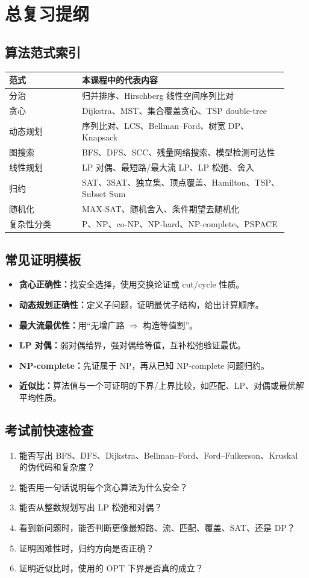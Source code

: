 \documentclass[UTF8,openany,12pt]{ctexbook}
\theoremstyle{remark}
\newcommand{\OPT}{\mathrm{OPT}}
\begin{document}
\backmatter
\chapter{总复习提纲}

\section{算法范式索引}
\begin{longtable}{p{0.24\linewidth}p{0.68\linewidth}}
\toprule
范式 & 本课程中的代表内容\\
\midrule
分治 & 归并排序、Hirschberg 线性空间序列比对\\
贪心 & Dijkstra、MST、集合覆盖贪心、TSP double-tree\\
动态规划 & 序列比对、LCS、Bellman--Ford、树宽 DP、Knapsack\\
图搜索 & BFS、DFS、SCC、残量网络搜索、模型检测可达性\\
线性规划 & LP 对偶、最短路/最大流 LP、LP 松弛、舍入\\
归约 & SAT、3SAT、独立集、顶点覆盖、Hamilton、TSP、Subset Sum\\
随机化 & MAX-SAT、随机舍入、条件期望去随机化\\
复杂性分类 & P、NP、co-NP、NP-hard、NP-complete、PSPACE\\
\bottomrule
\end{longtable}

\section{常见证明模板}
\begin{itemize}
  \item \textbf{贪心正确性：}找安全选择，使用交换论证或 cut/cycle 性质。
  \item \textbf{动态规划正确性：}定义子问题，证明最优子结构，给出计算顺序。
  \item \textbf{最大流最优性：}用“无增广路 $\Rightarrow$ 构造等值割”。
  \item \textbf{LP 对偶：}弱对偶给界，强对偶给等值，互补松弛验证最优。
  \item \textbf{NP-complete：}先证属于 NP，再从已知 NP-complete 问题归约。
  \item \textbf{近似比：}算法值与一个可证明的下界/上界比较，如匹配、LP、对偶或最优解平均性质。
\end{itemize}

\section{考试前快速检查}
\begin{enumerate}
  \item 能否写出 BFS、DFS、Dijkstra、Bellman--Ford、Ford--Fulkerson、Kruskal 的伪代码和复杂度？
  \item 能否用一句话说明每个贪心算法为什么安全？
  \item 能否从整数规划写出 LP 松弛和对偶？
  \item 看到新问题时，能否判断更像最短路、流、匹配、覆盖、SAT、还是 DP？
  \item 证明困难性时，归约方向是否正确？
  \item 证明近似比时，使用的 $\OPT$ 下界是否真的成立？
\end{enumerate}
\end{document}
